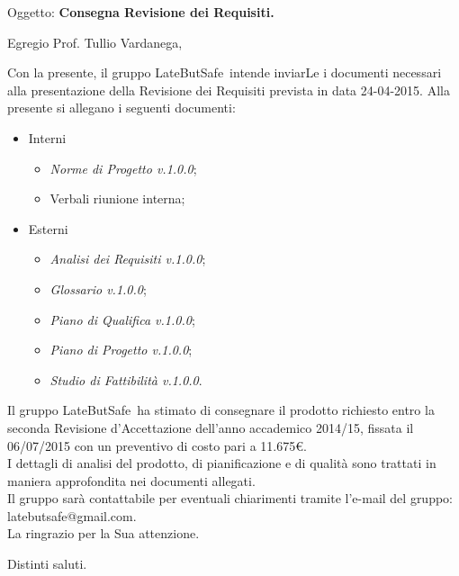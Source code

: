\documentclass{letter}
\makeatletter
\newcommand{\AnalisiDeiRequisiti}{\textit{Analisi dei Requisiti v.1.0.0}}
\newcommand{\PianoDiProgetto}{\textit{Piano di Progetto v.1.0.0}}
\newcommand{\NormeDiProgetto}{\textit{Norme di Progetto v.1.0.0}}
\newcommand{\PianoDiQualifica}{\textit{Piano di Qualifica v.1.0.0}}
\newcommand{\Glossario}{\textit{Glossario v.1.0.0}}
\newcommand{\StudioDiFattibilita}{\textit{Studio di Fattibilità v.1.0.0}}
\newcommand{\gruppo}{LateButSafe}
\newcommand{\mail}{latebutsafe@gmail.com}
\newcommand{\Vardanega}{Prof. Tullio Vardanega}
\makeatother
\begin{document}
	
	\begin{letter}{Oggetto: \textbf{Consegna Revisione dei Requisiti.}}
	\opening {Egregio \Vardanega ,}
	Con la presente, il gruppo \gruppo\ intende inviarLe i documenti necessari alla presentazione della Revisione dei Requisiti prevista in data 24-04-2015.
	Alla presente si allegano i seguenti documenti:
			\begin{itemize}
				\item Interni
					\begin{itemize}
						\item \NormeDiProgetto;
						\item Verbali riunione interna;						
					\end{itemize}
				\item Esterni
					\begin{itemize}
						\item \AnalisiDeiRequisiti;
						\item \Glossario;
						\item \PianoDiQualifica;
						\item \PianoDiProgetto;
						\item \StudioDiFattibilita.
					\end{itemize}
			\end{itemize} 
		Il gruppo \gruppo\ ha stimato di consegnare il prodotto richiesto entro la seconda Revisione d'Accettazione dell’anno accademico 2014/15, fissata il 06/07/2015 con un preventivo di costo pari a 11.675\euro. \\
		I dettagli di analisi del prodotto, di pianificazione e di qualità sono trattati in maniera	approfondita nei documenti allegati.	\\
		Il gruppo sarà  contattabile per eventuali chiarimenti tramite l'e-mail del gruppo: \mail.	\\
		La ringrazio per la Sua attenzione.
		
		\thispagestyle{fancy}
		\closing{Distinti saluti.}

   \end{letter}
\end{document}
